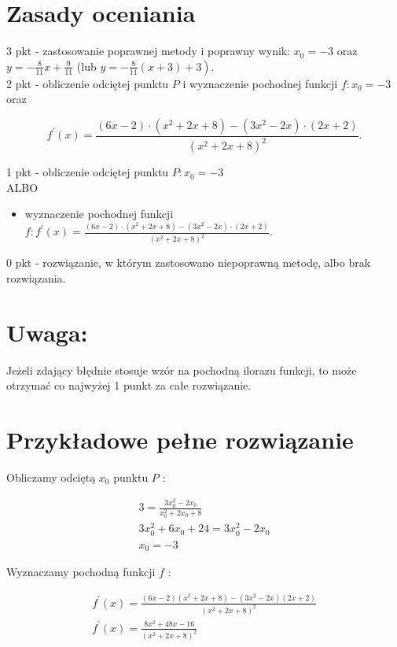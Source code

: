 \documentclass[10pt]{article}
\begin{document}
\section*{Zasady oceniania}
3 pkt - zastosowanie poprawnej metody i poprawny wynik: $x_{0}=-3$ oraz $y=-\frac{8}{11} x+\frac{9}{11}$ (lub $\left.y=-\frac{8}{11}(x+3)+3\right)$.\\
2 pkt - obliczenie odciętej punktu $P$ i wyznaczenie pochodnej funkcji $f: x_{0}=-3$ oraz

$$
f^{\prime}(x)=\frac{(6 x-2) \cdot\left(x^{2}+2 x+8\right)-\left(3 x^{2}-2 x\right) \cdot(2 x+2)}{\left(x^{2}+2 x+8\right)^{2}} .
$$

1 pkt - obliczenie odciętej punktu $P: x_{0}=-3$\\
ALBO

\begin{itemize}
  \item wyznaczenie pochodnej funkcji $f: f^{\prime}(x)=\frac{(6 x-2) \cdot\left(x^{2}+2 x+8\right)-\left(3 x^{2}-2 x\right) \cdot(2 x+2)}{\left(x^{2}+2 x+8\right)^{2}}$.
\end{itemize}

0 pkt - rozwiązanie, w którym zastosowano niepoprawną metodę, albo brak rozwiązania.

\section*{Uwaga:}
Jeżeli zdający błędnie stosuje wzór na pochodną ilorazu funkcji, to może otrzymać co najwyżej 1 punkt za całe rozwiązanie.

\section*{Przykładowe pełne rozwiązanie}
Obliczamy odciętą $x_{0}$ punktu $P$ :

$$
\begin{gathered}
3=\frac{3 x_{0}^{2}-2 x_{0}}{x_{0}^{2}+2 x_{0}+8} \\
3 x_{0}^{2}+6 x_{0}+24=3 x_{0}^{2}-2 x_{0} \\
x_{0}=-3
\end{gathered}
$$

Wyznaczamy pochodną funkcji $f$ :

$$
\begin{gathered}
f^{\prime}(x)=\frac{(6 x-2)\left(x^{2}+2 x+8\right)-\left(3 x^{2}-2 x\right)(2 x+2)}{\left(x^{2}+2 x+8\right)^{2}} \\
f^{\prime}(x)=\frac{8 x^{2}+48 x-16}{\left(x^{2}+2 x+8\right)^{2}}
\end{gathered}
$$
\end{document}
